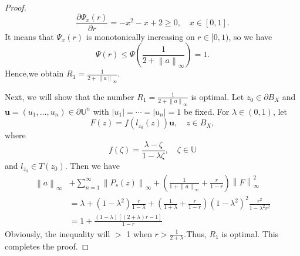 \documentclass{birkjour}
\theoremstyle{plain}
\theoremstyle{definition}
\theoremstyle{definition}
\begin{document}
\begin{proof}
\begin{equation*}
		\frac{\partial \Psi_x (r)}{\partial r} = -x^2-x+2 \ge 0, \quad x\in [0,1].
	\end{equation*}
	It means that $\Psi_x (r)$ is monotonically increasing on $r \in [0,1)$, so we have
	\begin{equation*}
		\Psi(r) \le \Psi(\frac{1}{2+\left \| a \right \|_{\infty} } ) =1.
	\end{equation*}
	Hence,we obtain $R_1=\frac{1}{2+\left \| a \right \|_{\infty} }$.
\par
	Next, we will show that the number $R_1=\frac{1}{2+\left \| a \right \|_{\infty} }$ is optimal.
	Let $z_0\in \partial B_X$ and $\mathbf{u}=(u_1,\dots,u_n)\in \partial \mathbb{U}^n$ with $|u_1|=\cdots=|u_n|=1$ be fixed. For $\lambda\in(0,1)$, let
	\begin{equation*}
	F(z)=f(l_{z_0}(z))\mathbf{u},\quad z\in B_X,
    \end{equation*}
	where
	\begin{equation*}
	f(\zeta)=\frac{\lambda-\zeta}{1-\lambda\zeta},\quad \zeta\in \mathbb{U}
    \end{equation*}
	and $l_{z_0}\in T(z_0)$. Then we have
	\begin{align*}
		\left \| a \right \| _\infty &+\sum_{n=1}^{\infty} \left \| P_s(z) \right \| _\infty+(\frac{1}{1+\left \| a \right \| _\infty} +\frac{r}{1-r} )\left \| F \right \|^2_\infty\\
		&=\lambda+(1-\lambda^2)\frac{r}{1-\lambda}+(\frac{1}{1+\lambda} +\frac{r}{1-r} )(1-\lambda^2)^2\frac{r^2}{1-\lambda^2r^2} \\
		&=1+\frac{(1-\lambda)[(2+\lambda)r-1]}{1-r}
	\end{align*}
	Obviously, the inequality will $>$ 1 when $r > \frac{1}{2+\lambda} $.Thus, $R_1$ is optimal. This completes the proof.
\end{proof}
\end{document}
